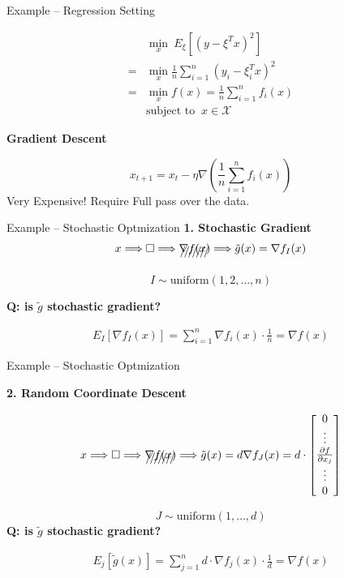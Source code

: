 \documentclass[aspectratio=169,xcolor=dvipsnames]{beamer}
\begin{document}

\begin{frame}{Example -- Regression Setting}

\begin{align*}
	&\min_x \ E_\xi[(y - \xi^T x)^2] \\
	=& \min_x \frac{1}{n} \sum_{i=1}^n (y_i - \xi_i^T x)^2\\
	=& \min_x f(x) = \frac{1}{n} \sum_{i=1}^n f_i(x)\\
	&\text{subject to } \ x \in \mathcal X
\end{align*}

\textbf{Gradient Descent}

\begin{equation*}
	x_{t+1} = x_t - \eta \nabla (\frac{1}{n} \sum_{i=1}^n f_i(x))
\end{equation*}
Very Expensive! Require Full pass over the data.	
\end{frame}


\begin{frame}{Example -- Stochastic Optmization}
\textbf{1. Stochastic Gradient}
\begin{align*}
	x \Longrightarrow \Box \Longrightarrow \xout{\nabla f(x)} \Longrightarrow \tilde g(x) = \nabla f_I(x)
\end{align*}

$$I \sim \text{uniform}(1, 2, \ldots, n)$$

\textbf{Q: is $\tilde g$ stochastic gradient? }


\begin{align*}
	E_I[\nabla f_I(x)] = \sum_{i = 1}^n \nabla f_i(x) \cdot \frac{1}{n} = \nabla f(x)
\end{align*}
	
\end{frame}


\begin{frame}{Example -- Stochastic Optmization}

\textbf{2. Random Coordinate Descent}

\begin{align*}
	x \Longrightarrow \Box \Longrightarrow \xout{\nabla f(x)} \Longrightarrow \tilde g(x) = d\nabla f_J(x) = d\cdot \begin{bmatrix}
		0 \\ \vdots \\ \frac{\partial f}{\partial x_j} \\ \vdots \\ 0
	\end{bmatrix}
\end{align*}

$$J\sim \text{uniform}(1, \ldots, d)$$
\textbf{Q: is $\tilde g$ stochastic gradient?}

\begin{align*}
	E_j[\tilde g(x)] = \sum_{j = 1}^n d \cdot  \nabla f_j(x) \cdot \frac{1}{d} = \nabla f(x)
\end{align*}

\end{frame}
\end{document}
